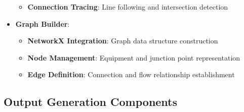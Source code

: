 \documentclass[12pt]{report}
\begin{document}
\begin{itemize}
\begin{itemize}
      \item \textbf{Connection Tracing}: Line following and intersection detection
    \end{itemize}
  \item \textbf{Graph Builder}:
    \begin{itemize}
      \item \textbf{NetworkX Integration}: Graph data structure construction
      \item \textbf{Node Management}: Equipment and junction point representation
      \item \textbf{Edge Definition}: Connection and flow relationship establishment
    \end{itemize}
\end{itemize}

\subsection{Output Generation Components}
\end{document}
